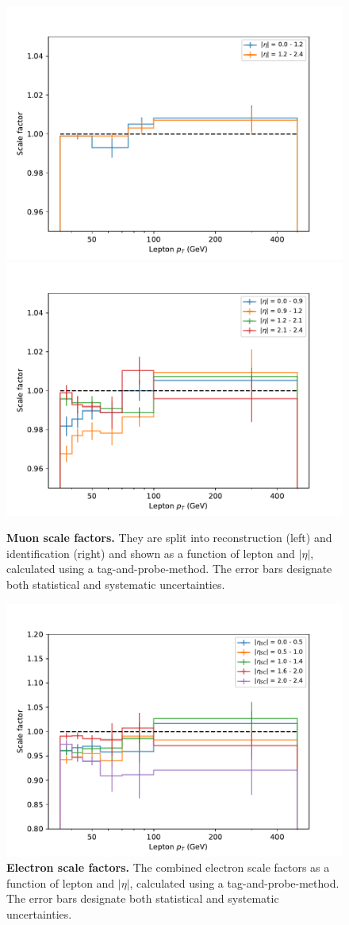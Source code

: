 \begin{figure}[t]
    \centering
    \includegraphics[width=0.49 \textwidth]{figures/ttxs/scalefactors/muonsf_reco.pdf}
    \hfill
    \includegraphics[width=0.49 \textwidth]{figures/ttxs/scalefactors/muonsf_id.pdf}
    \caption{\textbf{Muon scale factors.} They are split into reconstruction (left) and identification (right) and shown as a function of lepton \pt and $|\eta|$, calculated using a tag-and-probe-method. The error bars designate both statistical and systematic uncertainties. }
    \label{fig:ttxs:muonsf}
  \end{figure}
  
  \begin{figure}[t]
    \centering
    \includegraphics[width=0.49 \textwidth]{figures/ttxs/scalefactors/elesf.pdf}
    \caption{\textbf{Electron scale factors.} The combined electron scale factors as a function of lepton \pt and $|\eta|$, calculated using a tag-and-probe-method. The error bars designate both statistical and systematic uncertainties. }
    \label{fig:ttxs:elesf}
  \end{figure}

